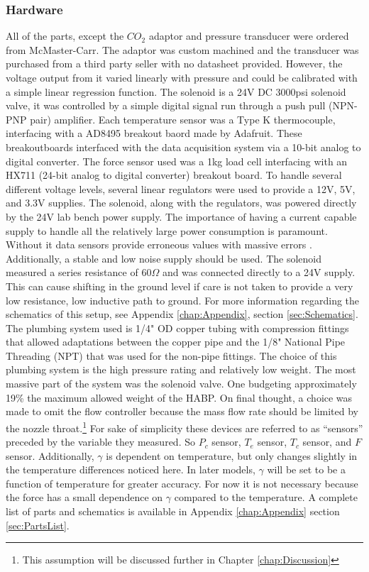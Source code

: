 \subsubsection{Hardware}
All of the parts, except the $CO_2$ adaptor and pressure transducer were ordered from McMaster-Carr. The adaptor was custom machined and the transducer was purchased from a third party seller with no datasheet provided. However, the voltage output from it varied linearly with pressure and could be calibrated with a simple linear regression function. The solenoid is a 24V DC 3000psi solenoid valve, it was controlled by a simple digital signal run through a push pull (NPN-PNP pair) amplifier. Each temperature sensor was a Type K thermocouple, interfacing with a AD8495 breakout baord made by Adafruit. These breakoutboards interfaced with the data acquisition system via a 10-bit analog to digital converter. The force sensor used was a 1kg load cell interfacing with an HX711 (24-bit analog to digital converter) breakout board. To handle several different voltage levels, several linear regulators were used to provide a 12V, 5V, and 3.3V supplies. The solenoid, along with the regulators, was powered directly by the 24V lab bench power supply. The importance of having a current capable supply to handle all the relatively large power consumption is paramount. Without it data sensors provide erroneous values with massive errors \cite{voltage}. Additionally, a stable and low noise supply should be used. The solenoid measured a series resistance of $60\Omega$ and was connected directly to a 24V supply. This can cause shifting in the ground level if care is not taken to provide a very low resistance, low inductive path to ground. For more information regarding the schematics of this setup, see Appendix \ref{chap:Appendix}, section \ref{sec:Schematics}. The plumbing system used is 1/4" OD copper tubing with compression fittings that allowed adaptations between the copper pipe and the 1/8" National Pipe Threading (NPT) that was used for the non-pipe fittings. The choice of this plumbing system is the high pressure rating and relatively low weight. The most massive part of the system was the solenoid valve. One budgeting approximately 19\% the maximum allowed weight of the HABP. On final thought, a choice was made to omit the flow controller because the mass flow rate should be limited by the nozzle throat.\footnote{This assumption will be discussed further in Chapter \ref{chap:Discussion}} For sake of simplicity these devices are referred to as ``sensors'' preceded by the variable they measured. So $P_c$ sensor, $T_e$ sensor, $T_c$ sensor, and $F$ sensor. Additionally, $\gamma$ is dependent on temperature, but only changes slightly in the temperature differences noticed here. In later models, $\gamma$ will be set to be a function of temperature for greater accuracy. For now it is not necessary because the force has a small dependence on $\gamma$ compared to the temperature. A complete list of parts and schematics is available in Appendix \ref{chap:Appendix} section \ref{sec:PartsList}.
